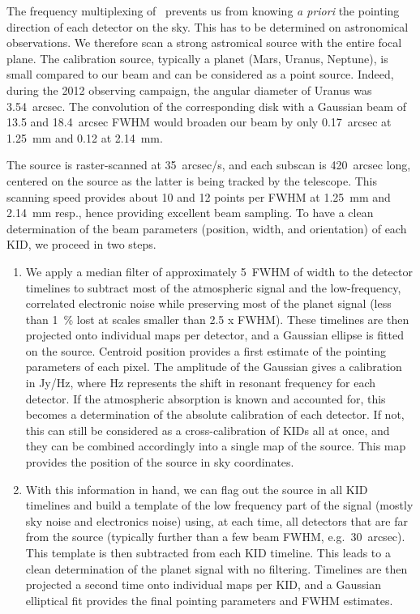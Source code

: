 %
The frequency multiplexing of \NIKA\ prevents us from knowing {\it a priori} the pointing
direction of each detector on the sky. This has to be determined on
astronomical observations. We therefore scan a strong astromical source with the
entire focal plane. The calibration source, typically a planet (Mars, Uranus,
Neptune), is small compared to our beam and can be considered as a point
source. Indeed, during the 2012 observing campaign, the angular
diameter of Uranus was 3.54~arcsec. The convolution of the corresponding disk with a Gaussian beam of
13.5 and 18.4~arcsec FWHM would broaden our beam by only 0.17~arcsec at 1.25~mm and 0.12 at 2.14~mm.

The source is raster-scanned at 35~arcsec/s, and each subscan is 420~arcsec
long, centered on the source as the latter is being tracked by 
the telescope. This scanning speed provides about 10 and 12 points per FWHM at
  1.25~mm and 2.14~mm resp., hence providing excellent beam sampling. To
have a clean determination of the beam parameters (position, width, and
orientation) of each KID, we proceed in two steps.
 
\begin{enumerate} 
\item We apply a median filter of approximately 5~FWHM of width to the detector timelines to
  subtract most of the atmospheric signal and the low-frequency, correlated
  electronic noise while preserving most of the planet signal (less than 1~\% lost at scales 
  smaller than 2.5 x FWHM). These timelines
  are then projected onto individual maps per detector, and a Gaussian ellipse is
  fitted on the source. Centroid position provides a first estimate of the pointing
  parameters of each pixel. The amplitude of the Gaussian gives a calibration in
  Jy/Hz, where Hz represents the shift in resonant frequency 
  for each detector. If the atmospheric absorption is known and accounted for, this
  becomes a determination of the absolute calibration of each detector. If not,
  this can still be considered as a cross-calibration of KIDs all at once, and
  they can be combined accordingly into a single map of the source. This map
  provides the position of the source in sky coordinates.
\item With this information in hand, we can flag out the source in all KID
  timelines and build a template of the low frequency part of the signal (mostly
  sky noise and electronics noise) using, at each time, all detectors that are
  far from the source (typically further than a few beam FWHM,
  e.g.~30~arcsec). This template is then subtracted from each KID timeline. This
  leads to a clean determination of the planet signal with no filtering. Timelines
  are then projected a second time onto individual maps per KID, and a Gaussian
  elliptical fit provides the final pointing parameters and FWHM estimates.
\end{enumerate}

